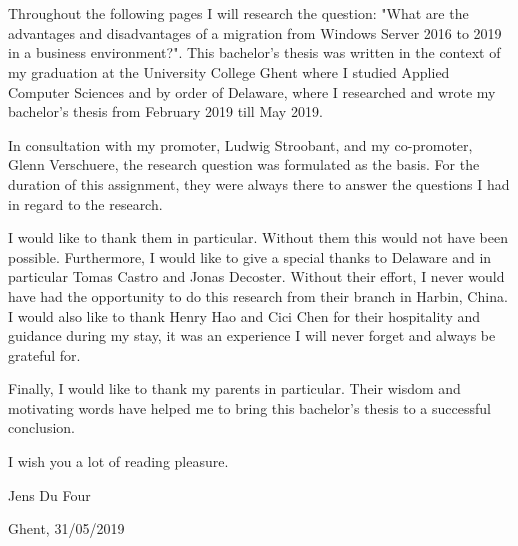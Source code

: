 
\chapter*{}
\label{ch:voorwoord}

Throughout the following pages I will research the question: "What are the advantages and disadvantages of a migration from Windows Server 2016 to 2019 in a business environment?". This bachelor's thesis was written in the context of my graduation at the University College Ghent where I studied Applied Computer Sciences and by order of Delaware, where I researched and wrote my bachelor's thesis from February 2019 till May 2019.

In consultation with my promoter, Ludwig Stroobant, and my co-promoter, Glenn Verschuere, the research question was formulated as the basis. For the duration of this assignment, they were always there to answer the questions I had in regard to the research. 

I would like to thank them in particular. Without them this would not have been possible.
Furthermore, I would like to give a special thanks to Delaware and in particular Tomas Castro and Jonas Decoster. Without their effort, I never would have had the opportunity to do this research from their branch in Harbin, China. I would also like to thank Henry Hao and Cici Chen for their hospitality and guidance during my stay, it was an experience I will never forget and always be grateful for. 

Finally, I would like to thank my parents in particular. Their wisdom and motivating words have helped me to bring this bachelor's thesis to a successful conclusion.

I wish you a lot of reading pleasure.

Jens Du Four

Ghent, 31/05/2019